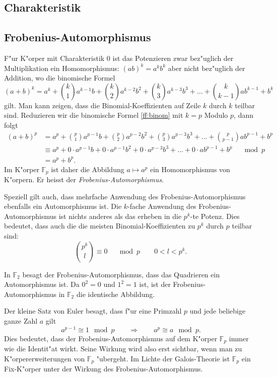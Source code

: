 \subsection{Charakteristik}

\subsection{Frobenius-Automorphismus}
F"ur K"orper mit Charakteristik $0$ ist das Potenzieren zwar bez"uglich der
Multiplikation ein Homomorphismus:
$
(ab)^k = a^kb^k
$
aber nicht bez"uglich der Addition, wo die binomische Formel
\begin{equation}
(a+b)^k
= 
a^k + \binom{k}{1} a^{k-1}b + \binom{k}{2} a^{k-2}b^2
+ \binom{k}{3}a^{k-3}b^3 + \dots + \binom{k}{k-1}ab^{k-1} + b^k
\label{ff:binom}
\end{equation}
gilt.
Man kann zeigen, dass die Binomial-Koeffizienten auf Zeile $k$ durch 
$k$ teilbar sind.
Reduzieren wir die binomische Formel \eqref{ff:binom} mit $k=p$ Modulo $p$,
dann folgt
\begin{align*}
(a+b)^p
&= 
a^p + \binom{p}{1} a^{p-1}b + \binom{p}{2} a^{p-2}b^2
+ \binom{p}{3}a^{p-3}b^3 + \dots + \binom{p}{p-1}ab^{p-1} + b^p
\\
&\equiv
a^p + 0\cdot a^{p-1}b + 0\cdot a^{p-1}b^2
+ 0\cdot a^{p-3}b^3 + \dots + 0\cdot ab^{p-1} + b^p
\quad\mod p
\\
&=
a^p + b^p.
\end{align*}
Im K"orper $\mathbb F_p$ ist daher die Abbildung $a\mapsto a^p$
ein Homomorphismus von K"orpern.
Er heisst der {\em Frobenius-Automorphismus}.

Speziell gilt auch, dass mehrfache Anwendung des Frobenius-Automorphismus
ebenfalls ein Automorphismus ist.
Die $k$-fache Anwendung des Frobenius-Automorphismus ist nichts anderes
als das erheben in die $p^k$-te Potenz.
Dies bedeutet, dass auch die die meisten Binomial-Koeffizienten zu $p^k$ 
durch $p$ teilbar sind:
\[
\binom{p^k}{l}\equiv 0\quad\mod p
\qquad
0<l<p^k.
\]

\begin{beispiel}
In $\mathbb F_2$ besagt der Frobenius-Automorphismus, dass das Quadrieren
ein Automorphismus ist.
Da $0^2=0$ und $1^2=1$ ist, ist der Frobenius-Automorphismus in $\mathbb F_2$
die identische Abbildung.
\end{beispiel}

Der kleine Satz von Euler besagt, dass f"ur eine Primzahl $p$ und jede
beliebige ganze Zahl $a$ gilt
\[
a^{p-1}\cong 1\mod p
\qquad\Rightarrow\qquad
a^p\cong a\mod p.
\]
Dies bedeutet, dass der Frobenius-Automorphismus auf dem K"orper $\mathbb F_p$
immer wie die Identit"at wirkt.
Seine Wirkung wird also erst sichtbar, wenn man zu K"orpererweiterungen
von $\mathbb F_p$ "ubergeht.
Im Lichte der Galois-Theorie ist $\mathbb F_p$ ein Fix-K"orper
unter der Wirkung des Frobenius-Automorphismus.

